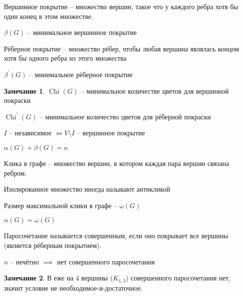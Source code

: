 \documentclass{book}
\newcommand{\p}[1]{#1^{\prime}}
\theoremstyle{definition}
\newtheorem*{note}{Замечание}
\DeclareMathOperator{\Chi}{Chi}
\begin{document}
\begin{definition}
    Вершинное покрытие -- множество вершин, такое что у каждого ребра хотя бы один конец в этом множестве.

    $\beta(G)$ -- минимальное вершинное покрытие
\end{definition}

\begin{definition}
    Рёберное покрытие -- множество рёбер, чтобы любая вершина являлась концом хотя бы одного ребра из этого множества

    $\p \beta(G)$ -- минимальное рёберное покрытие
\end{definition}

\begin{note}
    $\Chi(G)$ -- минимальное количестве цветов для вершинной покраски

    $\p \Chi(G)$ -- минимальное количество цветов для рёберной покраски
\end{note}

\begin{statement}
    $I$ -- независимое  $\iff V \setminus I$ -- вершинное покрытие
\end{statement}

\begin{corollary}
    $\alpha(G) + \beta(G) = n$
\end{corollary}

\begin{definition}
    Клика в графе -- множество вершин, в котором каждая пара вершин связана ребром.

    Изолированное множество иногда называют антикликой

    Размер максимальной клики в графе -- $\omega(G)$
\end{definition}

\begin{statement}
    $\alpha(G) = \omega(G)$
\end{statement}

\begin{definition}
    Паросочетание называется совершенным, если оно покрывает все вершины (является рёберным покрытием).
\end{definition}

\begin{corollary}
    $n$ -- нечётно  $\implies $ нет совершенного паросочетания
\end{corollary}

\begin{note}
    В еже на 4 вершины ($K_{1,3}$) совершенного паросочетания нет, значит условие не необходимое-и-достаточное.
\end{note}
\end{document}
